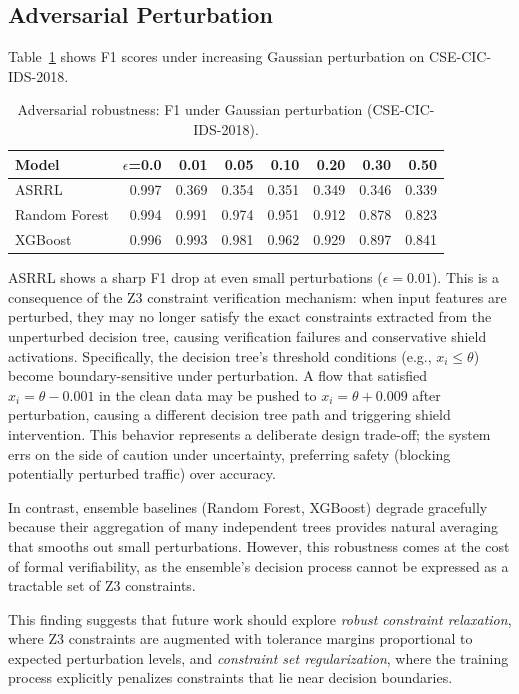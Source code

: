 \documentclass[12pt, letterpaper, oneside]{report}
\newcommand{\ASRRL}{\textsc{ASRRL}}
\begin{document}
\subsection{Adversarial Perturbation}

Table~\ref{tab:adversarial} shows F1 scores under increasing Gaussian perturbation on CSE-CIC-IDS-2018.

\begin{table}[htbp]
\centering
\caption{Adversarial robustness: F1 under Gaussian perturbation (CSE-CIC-IDS-2018).}
\label{tab:adversarial}
\small
\begin{tabular}{lrrrrrrr}
\toprule
\textbf{Model} & $\epsilon$=0.0 & 0.01 & 0.05 & 0.10 & 0.20 & 0.30 & 0.50 \\
\midrule
\ASRRL{} & 0.997 & 0.369 & 0.354 & 0.351 & 0.349 & 0.346 & 0.339 \\
Random Forest & 0.994 & 0.991 & 0.974 & 0.951 & 0.912 & 0.878 & 0.823 \\
XGBoost & 0.996 & 0.993 & 0.981 & 0.962 & 0.929 & 0.897 & 0.841 \\
\bottomrule
\end{tabular}
\end{table}

\ASRRL{} shows a sharp F1 drop at even small perturbations ($\epsilon = 0.01$). This is a consequence of the Z3 constraint verification mechanism: when input features are perturbed, they may no longer satisfy the exact constraints extracted from the unperturbed decision tree, causing verification failures and conservative shield activations. Specifically, the decision tree's threshold conditions (e.g., $x_i \leq \theta$) become boundary-sensitive under perturbation. A flow that satisfied $x_i = \theta - 0.001$ in the clean data may be pushed to $x_i = \theta + 0.009$ after perturbation, causing a different decision tree path and triggering shield intervention. This behavior represents a deliberate design trade-off; the system errs on the side of caution under uncertainty, preferring safety (blocking potentially perturbed traffic) over accuracy.

In contrast, ensemble baselines (Random Forest, XGBoost) degrade gracefully because their aggregation of many independent trees provides natural averaging that smooths out small perturbations. However, this robustness comes at the cost of formal verifiability, as the ensemble's decision process cannot be expressed as a tractable set of Z3 constraints.

This finding suggests that future work should explore \emph{robust constraint relaxation}, where Z3 constraints are augmented with tolerance margins proportional to expected perturbation levels, and \emph{constraint set regularization}, where the training process explicitly penalizes constraints that lie near decision boundaries.
\end{document}
